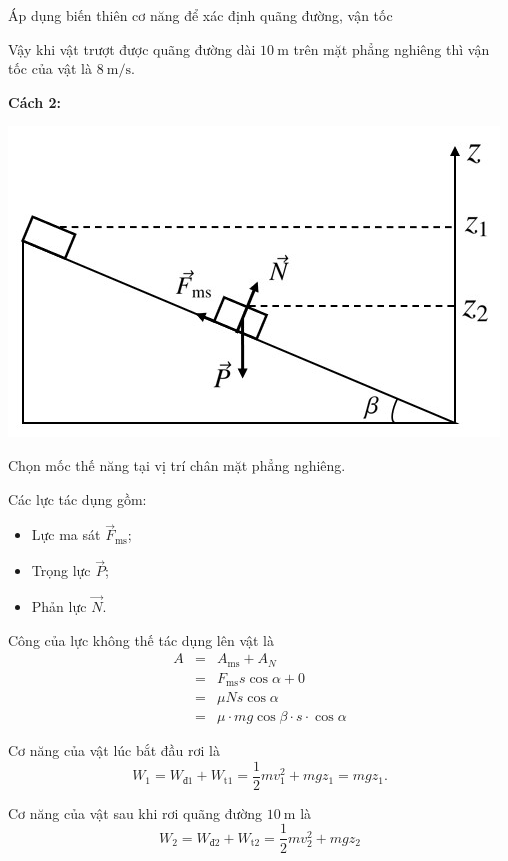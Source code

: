 \begin{dang}{Áp dụng biến thiên cơ năng để xác định quãng đường, vận tốc}
{		Vậy khi vật trượt được quãng đường dài $\SI{10}{\meter}$ trên mặt phẳng nghiêng thì vận tốc của vật là $\SI{8}{\meter/\second}$.
		
		\textbf{Cách 2:}
		
		\begin{center}
			\includegraphics[scale=0.5]{../figs/VN10-PH-33-L-025-3-H3.jpg}
		\end{center}
		
		Chọn mốc thế năng tại vị trí chân mặt phẳng nghiêng.
		
		Các lực tác dụng gồm:
		\begin{itemize}
			\item Lực ma sát $\vec{F}_\text{ms}$;
			\item Trọng lực $\vec{P}$;
			\item Phản lực $\vec{N}$.
		\end{itemize}
		
		Công của lực không thế tác dụng lên vật là
		\begin{eqnarray*}
			A&=&A_\text{ms}+A_N\\
			&=&F_\text{ms}s\cos\alpha+0\\
			&=&\mu N s\cos\alpha\\
			&=&\mu\cdot  mg\cos\beta \cdot s \cdot \cos\alpha
		\end{eqnarray*}
		
		Cơ năng của vật lúc bắt đầu rơi là
		\begin{equation*}
			W_1=W_\text{đ1}+W_\text{t1}=\dfrac{1}{2}mv_1^2+mgz_1=mgz_1.
		\end{equation*}
		
		Cơ năng của vật sau khi rơi quãng đường $\SI{10}{\meter}$ là
		\begin{equation*}
			W_2=W_\text{đ2}+W_\text{t2}=\dfrac{1}{2}mv_2^2+mgz_2
		\end{equation*}
		
}
\end{dang}
